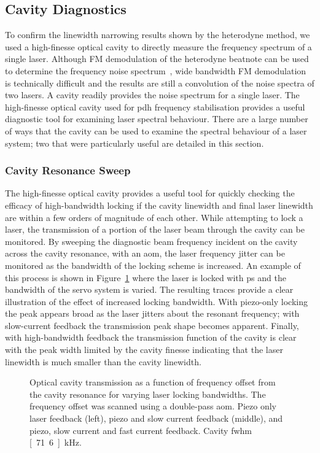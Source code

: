 \subsection{Cavity Diagnostics}

To confirm the linewidth narrowing results shown by the heterodyne method, we used a high-finesse optical cavity to directly measure the frequency spectrum of a single laser.
Although FM demodulation of the heterodyne beatnote can be used to determine the frequency noise spectrum~\cite{turner_frequency_2002}, wide bandwidth FM demodulation is technically difficult and the results are still a convolution of the noise spectra of two lasers.
A cavity readily provides the noise spectrum for a single laser.
The high-finesse optical cavity used for \gls{pdh} frequency stabilisation provides a useful diagnostic tool for examining laser spectral behaviour.
There are a large number of ways that the cavity can be used to examine the spectral behaviour of a laser system; two that were particularly useful are detailed in this section.

\subsubsection{Cavity Resonance Sweep}

The high-finesse optical cavity provides a useful tool for quickly checking the efficacy of high-bandwidth locking if the cavity linewidth and final laser linewidth are within a few orders of magnitude of each other.
While attempting to lock a laser, the transmission of a portion of the laser beam through the cavity can be monitored.
By sweeping the diagnostic beam frequency incident on the cavity across the cavity resonance, with an \gls{aom}, the laser frequency jitter can be monitored as the bandwidth of the locking scheme is increased.
An example of this process is shown in Figure~\ref{figure:cavity_scans} where the laser is locked with \gls{ps} and the bandwidth of the servo system is varied.
The resulting traces provide a clear illustration of the effect of increased locking bandwidth.
With piezo-only locking the peak appears broad as the laser jitters about the resonant frequency; with slow-current feedback the transmission peak shape becomes apparent.
Finally, with high-bandwidth feedback the transmission function of the cavity is clear with the peak width limited by the cavity finesse indicating that the laser linewidth is much smaller than the cavity linewidth.

\begin{figure}
\center

\caption[Optical cavity transmission demonstrating laser frequency lock bandwidths.]{Optical cavity transmission as a function of frequency offset from the cavity resonance for varying laser locking bandwidths. The frequency offset was scanned using a double-pass \gls{aom}. Piezo only laser feedback (left), piezo and slow current feedback (middle), and piezo, slow current and fast current feedback. Cavity \gls{fwhm} \unit[71.6]{kHz}.}
\label{figure:cavity_scans}
\end{figure}

